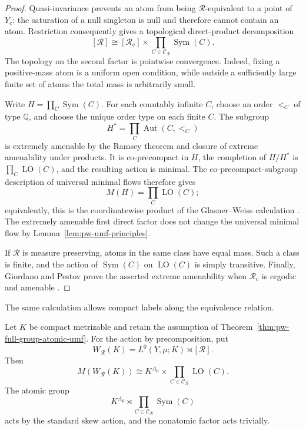 \begin{proof}
Quasi-invariance prevents an atom from being \(\mathcal R\)-equivalent to a
point of \(Y_{\mathrm c}\): the saturation of a null singleton is null and
therefore cannot contain an atom. Restriction consequently gives a topological
direct-product decomposition
\[
 [\mathcal R]
 \cong [\mathcal R_{\mathrm c}]
 \times\prod_{C\in\mathcal C_{\mathcal R}}\operatorname{Sym}(C).
\]
The topology on the second factor is pointwise convergence. Indeed, fixing a
positive-mass atom is a uniform open condition, while outside a sufficiently
large finite set of atoms the total mass is arbitrarily small.

Write \(H=\prod_C\operatorname{Sym}(C)\). For each countably infinite \(C\),
choose an order \(<_C\) of type \(\mathbb Q\), and choose the unique order type
on each finite \(C\). The subgroup
\[
 H^*=\prod_C\operatorname{Aut}(C,<_C)
\]
is extremely amenable by the Ramsey theorem and closure of extreme amenability
under products. It is co-precompact in \(H\), the completion of \(H/H^*\) is
\(\prod_C\operatorname{LO}(C)\), and the resulting action is minimal. The
co-precompact-subgroup description of universal minimal flows
\cite[Theorem~1.1]{BYMT2017} therefore gives
\[
 M(H)=\prod_C\operatorname{LO}(C);
\]
equivalently, this is the coordinatewise product of the Glasner--Weiss
calculation \cite{GlasnerWeiss2002}. The extremely amenable first direct factor does not
change the universal minimal flow by Lemma~\ref{lem:pw-umf-principles}.

If \(\mathcal R\) is measure preserving, atoms in the same class have equal
mass. Such a class is finite, and the action of \(\operatorname{Sym}(C)\) on
\(\operatorname{LO}(C)\) is simply transitive. Finally, Giordano and Pestov
prove the asserted extreme amenability when \(\mathcal R_{\mathrm c}\) is
ergodic and amenable \cite[Theorem~5.7]{GiordanoPestov2007}.
\end{proof}

The same calculation allows compact labels along the equivalence relation.

\begin{corollary}\label{cor:pw-decorated-full-group-umf}
Let \(K\) be compact metrizable and retain the assumption of
Theorem~\ref{thm:pw-full-group-atomic-umf}. For the action by precomposition, put
\[
 W_{\mathcal R}(K)=L^0(Y,\mu;K)\rtimes[\mathcal R].
\]
Then
\[
 M(W_{\mathcal R}(K))
 \cong K^{A_\mu}\times
       \prod_{C\in\mathcal C_{\mathcal R}}\operatorname{LO}(C).
\]
The atomic group
\[
 K^{A_\mu}\rtimes
 \prod_{C\in\mathcal C_{\mathcal R}}\operatorname{Sym}(C)
\]
acts by the standard skew action, and the nonatomic factor acts trivially.
\end{corollary}

